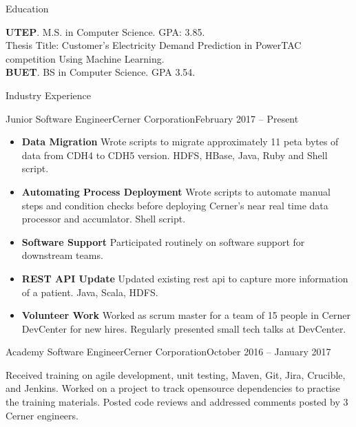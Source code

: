 \documentclass[]{mcdowellcv}
\begin{document}
	\makeheader
	
	
	\begin{cvsection}{Education}
		\begin{cvsubsection}{}{}{}
				\textbf{UTEP}. M.S. in Computer Science.  GPA: 3.85. \\
				Thesis Title: Customer's Electricity Demand Prediction in PowerTAC competition Using Machine Learning. \\
				\textbf{BUET}. BS in Computer Science. GPA 3.54.  
		\end{cvsubsection}
	\end{cvsection}

	\begin{cvsection}{Industry Experience}
		
		\begin{cvsubsection}{Junior Software Engineer}{Cerner Corporation}{February 2017 -- Present}
			\begin{itemize}
				\item \textbf{Data Migration} Wrote scripts to migrate approximately 11 peta bytes of data from CDH4 to CDH5 version. HDFS, HBase, Java, Ruby and Shell script.
				
				\item \textbf{Automating Process Deployment} Wrote scripts to automate manual steps and condition checks before deploying Cerner's near real time data processor and accumlator. Shell script.
				\item \textbf{Software Support} Participated routinely on software support for downstream teams. 
				\item \textbf{REST API Update} Updated existing rest api to capture more information of a patient. Java, Scala, HDFS. 
				\item \textbf{Volunteer Work} Worked as scrum master for a team of 15 people in Cerner DevCenter for new hires. Regularly presented small tech talks at DevCenter. 
			\end{itemize}
		\end{cvsubsection}		
		\begin{cvsubsection}{Academy Software Engineer}{Cerner Corporation}{October 2016 -- January 2017}	
			\item Received training on agile development, unit testing, Maven, Git, Jira, Crucible, and Jenkins. Worked on a project to track opensource dependencies to practise the training materials. Posted code reviews and addressed comments posted by 3 Cerner engineers.
		\end{cvsubsection}

	\end{cvsection}
	
\end{document}
